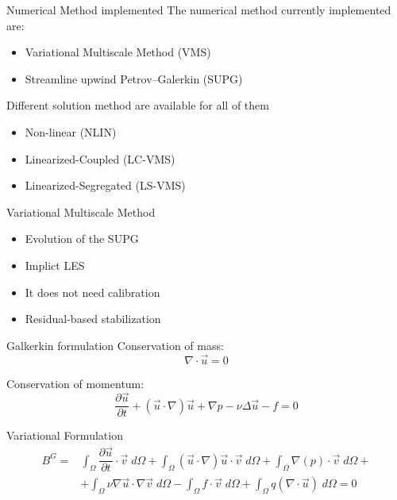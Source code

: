 \begin{frame}{Numerical Method implemented}
The numerical method currently implemented are:
  \begin{itemize}
    \item Variational Multiscale Method (VMS)
    \item Streamline upwind Petrov–Galerkin (SUPG)
  \end{itemize} 

Different solution method are available for all of them 
  \begin{itemize}
    \item Non-linear (NLIN)
    \item Linearized-Coupled (LC-VMS)
    \item Linearized-Segregated (LS-VMS)
  \end{itemize} 
\end{frame}


\begin{frame}{Variational Multiscale Method}
  \begin{itemize}
    \item Evolution of the SUPG
    \item Implict LES
    \item It does not need calibration
    \item Residual-based stabilization
  \end{itemize} 
\end{frame}


\begin{frame}{Galkerkin formulation}
Conservation of mass:
\begin{equation}
    \nabla\cdot \Vec{u} = 0
    \label{equfo:cont}
\end{equation}

Conservation of momentum:
\begin{equation}
    \dfrac{\partial \Vec{u}}{\partial t} + (\Vec{u}\cdot\nabla)\Vec{u} + \nabla p - \nu\Delta\Vec{u} - f = 0
        \label{equfo:mom}
\end{equation}

Variational Formulation
\begin{equation}
\begin{split}
  B^G = &   \int_\Omega \dfrac{\partial \Vec{u}}{\partial t}\cdot \Vec{v}\;d\Omega +
    \int_\Omega(\Vec{u}\cdot\nabla)\Vec{u}\cdot \Vec{v} \;d\Omega+ 
    \int_\Omega \nabla (p)\cdot\Vec{v} \;d\Omega + \\
     & + \int_\Omega\nu\nabla\Vec{u}\cdot\nabla\Vec{v} \;d\Omega  -
        \int_\Omega f\cdot\Vec{v} \;d\Omega + 
    \int_\Omega q(\nabla \cdot \Vec{u})\;d\Omega = 0
    \end{split}
    \label{equ:weak}
\end{equation}

\end{frame}

